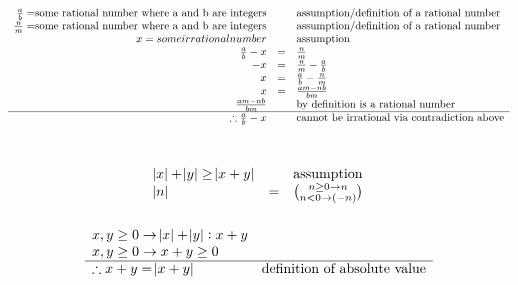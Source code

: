 \documentclass[letterpaper]{article}
\begin{document}
	\section{}
    	\begin{displaymath}
    		\begin{array}{rcl}
    			\frac{a}{b} = $some rational number where a and b are integers$ && 
                	$assumption/definition of a rational number$\\
                \frac{n}{m} = $some rational number where a and b are integers$ && 
                	$assumption/definition of a rational number$\\
                x = some irrational number && $assumption$\\
                \frac{a}{b} - x &=& \frac{n}{m}\\
                -x &=& \frac{n}{m} - \frac{a}{b}\\
                x &=& \frac{a}{b} - \frac{n}{m}\\
                x &=& \frac{am - nb}{bm}\\
                \frac{am - nb}{bm} && $by definition is a rational number$\\
                \hline
                \therefore \frac{a}{b} - x && $cannot be irrational via contradiction above$\\ 
    		\end{array}
    	\end{displaymath}
	\section{}
    	\begin{displaymath}
    		\begin{array}{lll}
            	\abs{x} + \abs{y} \geq \abs{x + y} && $assumption$\\
    			\abs{n} &=& \binom{n \geq 0 \rightarrow n}{n < 0 \rightarrow (-n)} 
    		\end{array}
    	\end{displaymath}
        \subsubsection{}
        	\begin{displaymath}
        		\begin{array}{ll}
        			x, y \geq 0 \rightarrow \abs{x} + \abs{y}: x + y &\\
                    x, y \geq 0 \rightarrow x + y \geq 0 &\\
                    \hline
                    \therefore x + y = \abs{x + y} & $definition of absolute value$
        		\end{array}
        	\end{displaymath}
\end{document}
